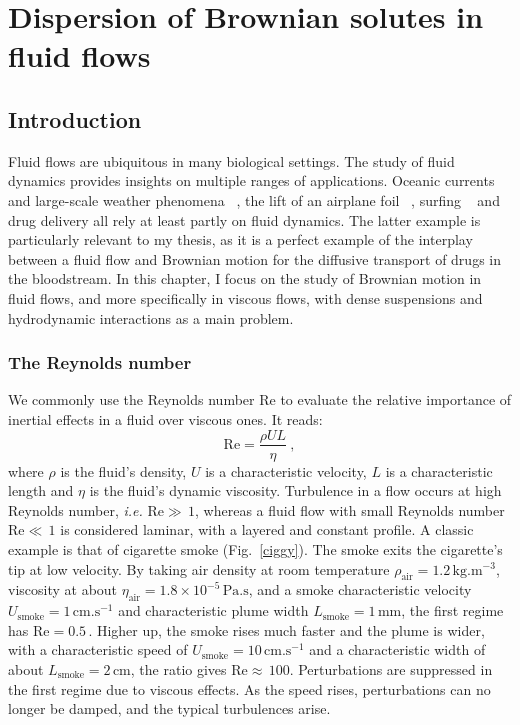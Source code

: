\chapter{Dispersion of Brownian solutes in fluid flows}
\label{ch:4}


\section{Introduction}
Fluid flows are ubiquitous in many biological settings. The study of fluid dynamics provides insights on multiple ranges of applications.
Oceanic currents and large-scale weather phenomena ~\cite{pedlosky_geophysical_1987}, the lift of an airplane foil ~\cite{anderson_aerodynamics_2016}, surfing ~\cite{butt_physics_2024} and drug delivery all rely at least partly on fluid dynamics. The latter example is particularly relevant to my thesis, as it is a perfect example of the interplay between a fluid flow and Brownian motion for the diffusive transport of drugs in the bloodstream. In this chapter, I focus on the study of Brownian motion in fluid flows, and more specifically in viscous flows, with dense suspensions and hydrodynamic interactions as a main problem. 

\subsection{The Reynolds number}
We commonly use the Reynolds number $\mathrm{Re}$ to evaluate the relative importance of inertial effects in a fluid over viscous ones. It reads:
\begin{equation}
    \mathrm{Re} = \dfrac{\rho U L}{\eta}~,
    \label{Reynolds_number}
\end{equation}
where $\rho$ is the fluid's density, $U$ is a characteristic velocity, $L$ is a characteristic length and $\eta$ is the fluid's dynamic viscosity. Turbulence in a flow occurs at high Reynolds number, \emph{i.e.} $\mathrm{Re} \gg \, 1$, whereas a fluid flow with small Reynolds number $\mathrm{Re}\ll \, 1 $ is considered laminar, with a layered and constant profile. A classic example is that of cigarette smoke (Fig.~\ref{ciggy}). The smoke exits the cigarette's tip at low velocity. By taking air density at room temperature $\rho_\mathrm{air} = 1.2 \, \mathrm{kg}.\mathrm{m}^{-3}$, viscosity at about $\eta_\mathrm{air} = 1.8\times 10^{-5}\, \mathrm{Pa.s}$, and a smoke characteristic velocity $U_\mathrm{smoke} = 1 \,\mathrm{cm}.\mathrm{s}^{-1}$ and characteristic plume width $L_\mathrm{smoke} = 1 \, \mathrm{mm}$, the first regime has $\mathrm{Re} = 0.5\,$. Higher up, the smoke rises much faster and the plume is wider, with a characteristic speed of $U_\mathrm{smoke} = 10 \, \mathrm{cm}.\mathrm{s}^{-1}$ and a characteristic width of about $L_\mathrm{smoke} = 2 \, \mathrm{cm}$, the ratio gives $\mathrm{Re} \approx \,100$. Perturbations are suppressed in the first regime due to viscous effects. As the speed rises, perturbations can no longer be damped, and the typical turbulences arise.


